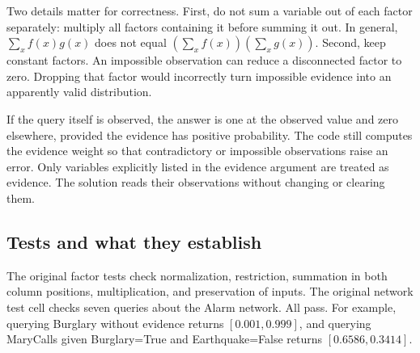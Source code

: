 \documentclass[11pt,a4paper]{article}
\begin{document}
Two details matter for correctness. First, do not sum a variable out of each
factor separately: multiply all factors containing it before summing it out.
In general, \(\sum_x f(x)g(x)\) does not equal
\((\sum_x f(x))(\sum_x g(x))\).
Second, keep constant factors. An impossible observation can reduce a disconnected
factor to zero. Dropping that factor would incorrectly turn impossible evidence
into an apparently valid distribution.

If the query itself is observed, the answer is one at the observed value and zero
elsewhere, provided the evidence has positive probability. The code still computes
the evidence weight so that contradictory or impossible observations raise an error.
Only variables explicitly listed in the evidence argument are treated as evidence.
The solution reads their observations without changing or clearing them.
\subsection{Tests and what they establish}
The original factor tests check normalization, restriction, summation in both
column positions, multiplication, and preservation of inputs. The original
network test cell checks seven queries about the Alarm network. All pass.
For example, querying Burglary without evidence returns \([0.001,0.999]\), and
querying MaryCalls given Burglary=True and Earthquake=False returns
\([0.6586,0.3414]\).
\end{document}
